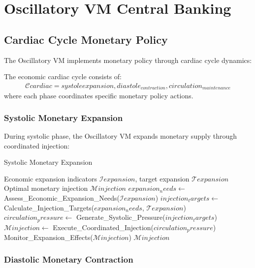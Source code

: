 \section{Oscillatory VM Central Banking}

\subsection{Cardiac Cycle Monetary Policy}

The Oscillatory VM implements monetary policy through cardiac cycle dynamics:

\begin{definition}
The economic cardiac cycle consists of:
\begin{align}
\mathcal{C}{cardiac} = {systole{expansion}, diastole_{contraction}, circulation_{maintenance}}
\end{align}
where each phase coordinates specific monetary policy actions.
\end{definition}

\subsubsection{Systolic Monetary Expansion}

During systolic phase, the Oscillatory VM expands monetary supply through coordinated injection:

\begin{algorithm}
\caption{Systolic Monetary Expansion}
\begin{algorithmic}[1]
\REQUIRE Economic expansion indicators $\mathcal{I}{expansion}$, target expansion $\mathcal{T}{expansion}$
\ENSURE Optimal monetary injection $\mathcal{M}{injection}$
\STATE $expansion_needs \leftarrow$ Assess_Economic_Expansion_Needs($\mathcal{I}{expansion}$)
\STATE $injection_targets \leftarrow$ Calculate_Injection_Targets($expansion_needs$, $\mathcal{T}{expansion}$)
\STATE $circulation_pressure \leftarrow$ Generate_Systolic_Pressure($injection_targets$)
\STATE $\mathcal{M}{injection} \leftarrow$ Execute_Coordinated_Injection($circulation_pressure$)
\STATE Monitor_Expansion_Effects($\mathcal{M}{injection}$)
\RETURN $\mathcal{M}{injection}$
\end{algorithmic}
\end{algorithm}

\subsubsection{Diastolic Monetary Contraction}

